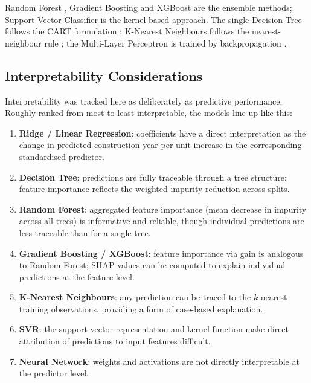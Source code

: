 \documentclass[11pt,a4paper]{article}
\providecommand{\tightlist}{\setlength{\itemsep}{0pt}\setlength{\parskip}{0pt}}
\begin{document}
Random Forest \autocite{Breiman2001}, Gradient Boosting
\autocite{Friedman2001} and XGBoost \autocite{ChenGuestrin2016} are the
ensemble methods; Support Vector Classifier \autocite{Cortes1995} is the
kernel-based approach. The single Decision Tree follows the CART
formulation \autocite{BreimanEtAl1984}; K-Nearest Neighbours follows the
nearest-neighbour rule \autocite{CoverHart1967}; the Multi-Layer
Perceptron is trained by backpropagation \autocite{RumelhartEtAl1986}.

\subsection{Interpretability
Considerations}\label{interpretability-considerations}

Interpretability was tracked here as deliberately as predictive
performance. Roughly ranked from most to least interpretable, the models
line up like this:

\begin{enumerate}
\def\labelenumi{\arabic{enumi}.}
\tightlist
\item
  \textbf{Ridge / Linear Regression}: coefficients have a direct
  interpretation as the change in predicted construction year per unit
  increase in the corresponding standardised predictor.
\item
  \textbf{Decision Tree}: predictions are fully traceable through a tree
  structure; feature importance reflects the weighted impurity reduction
  across splits.
\item
  \textbf{Random Forest}: aggregated feature importance (mean decrease
  in impurity across all trees) is informative and reliable, though
  individual predictions are less traceable than for a single tree.
\item
  \textbf{Gradient Boosting / XGBoost}: feature importance via gain is
  analogous to Random Forest; SHAP values can be computed to explain
  individual predictions at the feature level.
\item
  \textbf{K-Nearest Neighbours}: any prediction can be traced to the
  \(k\) nearest training observations, providing a form of case-based
  explanation.
\item
  \textbf{SVR}: the support vector representation and kernel function
  make direct attribution of predictions to input features difficult.
\item
  \textbf{Neural Network}: weights and activations are not directly
  interpretable at the predictor level.
\end{enumerate}
\end{document}

